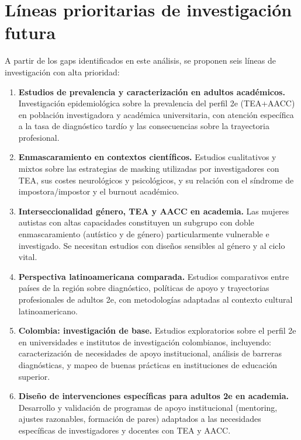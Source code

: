 \documentclass[12pt, a4paper]{article}
\begin{document}
\section{Líneas prioritarias de investigación futura}
\label{sec:futuro}

A partir de los gaps identificados en este análisis, se proponen seis líneas de
investigación con alta prioridad:

\begin{enumerate}[leftmargin=*, label=\textbf{LP\arabic*.}, itemsep=4pt]
    \item \textbf{Estudios de prevalencia y caracterización en adultos académicos.}
    Investigación epidemiológica sobre la prevalencia del perfil 2e (TEA+AACC) en
    población investigadora y académica universitaria, con atención específica a la
    tasa de diagnóstico tardío y las consecuencias sobre la trayectoria profesional.

    \item \textbf{Enmascaramiento en contextos científicos.}
    Estudios cualitativos y mixtos sobre las estrategias de masking utilizadas por
    investigadores con TEA, sus costes neurológicos y psicológicos, y su relación
    con el síndrome de impostora/impostor y el burnout académico.

    \item \textbf{Interseccionalidad género, TEA y AACC en academia.}
    Las mujeres autistas con altas capacidades constituyen un subgrupo con doble
    enmascaramiento (autístico y de género) particularmente vulnerable e
    investigado. Se necesitan estudios con diseños sensibles al género y al
    ciclo vital.

    \item \textbf{Perspectiva latinoamericana comparada.}
    Estudios comparativos entre países de la región sobre diagnóstico, políticas
    de apoyo y trayectorias profesionales de adultos 2e, con metodologías adaptadas
    al contexto cultural latinoamericano.

    \item \textbf{Colombia: investigación de base.}
    Estudios exploratorios sobre el perfil 2e en universidades e institutos de
    investigación colombianos, incluyendo: caracterización de necesidades de apoyo
    institucional, análisis de barreras diagnósticas, y mapeo de buenas prácticas
    en instituciones de educación superior.

    \item \textbf{Diseño de intervenciones específicas para adultos 2e en academia.}
    Desarrollo y validación de programas de apoyo institucional (mentoring, ajustes
    razonables, formación de pares) adaptados a las necesidades específicas de
    investigadores y docentes con TEA y AACC.
\end{enumerate}
\end{document}
